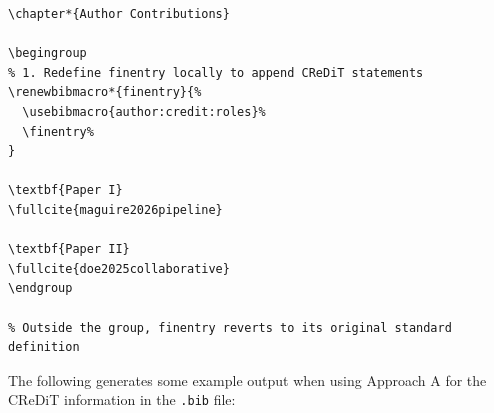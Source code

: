 \documentclass[12pt, twoside]{article}
\newcommand{\fname}[1]{\texttt{#1}}
\begin{document}
\begin{lstlisting}[style=latexExampleForAuthors, escapechar=|, basicstyle=\footnotesize, caption={{Local group scoping for CReDiT bibliography output}}, label=lst:biberHookExampleLocalGroupScoping]
\chapter*{Author Contributions}

\begingroup
% 1. Redefine finentry locally to append CReDiT statements
\renewbibmacro*{finentry}{%
  \usebibmacro{author:credit:roles}%
  \finentry%
}

\textbf{Paper I}
\fullcite{maguire2026pipeline}

\textbf{Paper II}
\fullcite{doe2025collaborative}
\endgroup

% Outside the group, finentry reverts to its original standard definition
\end{lstlisting}

The following generates some example output when using Approach A for the \gls{CReDiT} information in the \fname{.bib} file:
\begingroup
\newcommand{\formatcreditrole}[1]{%
  \ifcsdef{credit@#1}{\csuse{credit@#1}}{\detokenize{#1}}%
}

\newcommand*{\CreditSlugList}{%
  conceptualization,data-curation,formal-analysis,funding-acquisition,%
  investigation,methodology,project-administration,resources,software,%
  supervision,validation,visualization,writing-original-draft,writing-review-editing,equal%
}

\newcommand*{\checkandprintrole}[2]{%
  \haspartannotation[author][default][#1]{#2}{%
    \par\hspace*{1.5em}\formatcreditrole{#2}: \textit{\getpartannotation[author][default][#1]{#2}}%
  }{}%
}
\end{document}
